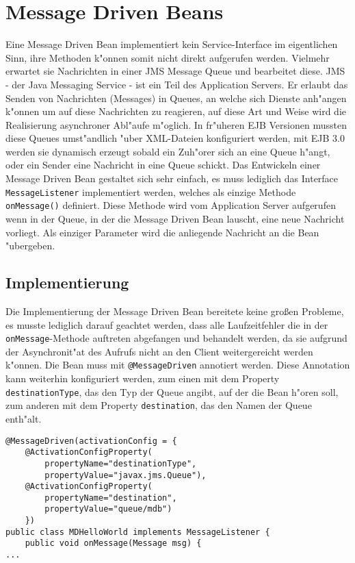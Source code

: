 \section{Message Driven Beans}
\label{sec:chap2:mdb}

Eine Message Driven Bean implementiert kein Service-Interface im eigentlichen Sinn, ihre
Methoden k"onnen somit nicht direkt aufgerufen werden.
Vielmehr erwartet sie 
Nachrichten in einer JMS Message Queue und bearbeitet diese.  JMS - der Java Messaging Service - 
ist ein Teil des Application Servers. Er erlaubt das Senden von Nachrichten (Messages) in
Queues, an welche sich Dienste anh"angen k"onnen um auf diese Nachrichten zu reagieren,
auf diese Art und Weise wird die Realisierung asynchroner Abl"aufe m"oglich.
In fr"uheren EJB Versionen mussten diese Queues umst"andlich "uber XML-Dateien konfiguriert werden,
mit EJB 3.0 werden sie dynamisch erzeugt sobald ein Zuh"orer sich an eine Queue h"angt, oder
ein Sender eine Nachricht in eine Queue schickt. Das Entwickeln einer Message Driven Bean 
gestaltet sich sehr einfach, es muss lediglich das Interface \texttt{MessageListener} implementiert
werden, welches als einzige Methode \texttt{onMessage()} definiert. Diese Methode wird vom Application
Server aufgerufen wenn in der Queue, in der die Message Driven Bean lauscht, eine neue Nachricht vorliegt.
Als einziger Parameter wird die anliegende Nachricht an die Bean "ubergeben.

\subsection{Implementierung}
\label{sec:chap2:mdb:impl}

Die Implementierung der Message Driven Bean bereitete keine gro\ss en Probleme, es musste lediglich
darauf geachtet werden, dass alle Laufzeitfehler die in der \texttt{onMessage}-Methode auftreten
abgefangen und behandelt werden, da sie aufgrund der Asynchronit"at des Aufrufs nicht an den 
Client weitergereicht werden k"onnen. Die Bean muss mit \texttt{@MessageDriven} annotiert werden.
Diese Annotation kann weiterhin konfiguriert werden, zum einen mit dem Property \texttt{destinationType}, 
das den Typ der Queue angibt, auf der die Bean h"oren soll, zum anderen mit dem Property \texttt{destination},
das den Namen der Queue enth"alt.

\begin{lstlisting}[caption=Konfiguration der Message Driven Bean]
@MessageDriven(activationConfig = {
    @ActivationConfigProperty(
        propertyName="destinationType", 
        propertyValue="javax.jms.Queue"),
    @ActivationConfigProperty(
        propertyName="destination", 
        propertyValue="queue/mdb")
    })
public class MDHelloWorld implements MessageListener {
    public void onMessage(Message msg) {
...
\end{lstlisting}

